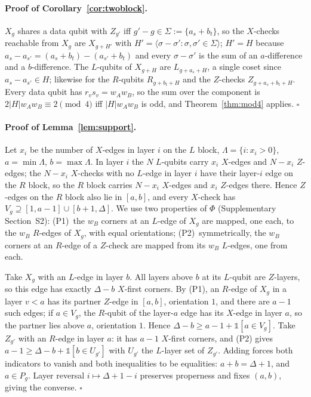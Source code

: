 \documentclass[reprint,twocolumn,superscriptaddress,nofootinbib]{revtex4-2}
\theoremstyle{plain}
\newcommand{\wA}{w_A}                  %
\newcommand{\wB}{w_B}
\begin{document}
\paragraph*{Proof of Corollary~\ref{cor:twoblock}.}
$X_g$ shares a data qubit with $Z_{g'}$ iff $g'-g\in\Sigma:=\{a_s+b_t\}$,
so the $X$-checks reachable from $X_g$ are $X_{g+H'}$ with
$H'=\langle\sigma-\sigma':\sigma,\sigma'\in\Sigma\rangle$; $H'=H$ because
$a_s-a_{s'}=(a_s+b_t)-(a_{s'}+b_t)$ and every $\sigma-\sigma'$ is the sum
of an $a$-difference and a $b$-difference. The $L$-qubits of $X_{g+H}$ are
$L_{g+a_s+H}$, a single coset since $a_s-a_{s'}\in H$; likewise for the
$R$-qubits $R_{g+b_t+H}$ and the $Z$-checks $Z_{g+a_s+b_t+H}$. Every data
qubit has $r_vs_v=\wA\wB$, so the sum over the component is
$2|H|\wA\wB\equiv2\pmod4$ iff $|H|\wA\wB$ is odd, and
Theorem~\ref{thm:mod4} applies. \hfill$\square$

\paragraph*{Proof of Lemma~\ref{lem:support}.}
Let $x_i$ be the number of $X$-edges in layer $i$ on the $L$ block,
$\Lambda=\{i:x_i>0\}$, $a=\min\Lambda$, $b=\max\Lambda$. In layer $i$ the
$N$ $L$-qubits carry $x_i$ $X$-edges and $N-x_i$ $Z$-edges; the $N-x_i$
$X$-checks with no $L$-edge in layer $i$ have their layer-$i$ edge on the
$R$ block, so the $R$ block carries $N-x_i$ $X$-edges and $x_i$ $Z$-edges
there. Hence $Z$-edges on the $R$ block also lie in $[a,b]$, and every
$X$-check has $V_g\supseteq[1,a-1]\cup[b+1,\Delta]$. We use two properties
of $\Phi$ (Supplementary Section~S2): (P1)~the $\wB$ corners at an
$L$-edge of $X_g$ are mapped, one each, to the $\wB$ $R$-edges of $X_g$,
with equal orientations; (P2)~symmetrically, the $\wB$ corners at an
$R$-edge of a $Z$-check are mapped from its $\wB$ $L$-edges, one from
each.

Take $X_g$ with an $L$-edge in layer $b$. All layers above $b$ at its
$L$-qubit are $Z$-layers, so this edge has exactly $\Delta-b$ $X$-first
corners. By (P1), an $R$-edge of $X_g$ in a layer $v<a$ has its partner
$Z$-edge in $[a,b]$, orientation $1$, and there are $a-1$ such edges; if
$a\in V_g$, the $R$-qubit of the layer-$a$ edge has its $X$-edge in layer
$a$, so the partner lies above $a$, orientation $1$. Hence
$\Delta-b\ge a-1+\mathbb{1}[a\in V_g]$. Take $Z_{g'}$ with an $R$-edge in
layer $a$: it has $a-1$ $X$-first corners, and (P2) gives
$a-1\ge\Delta-b+\mathbb{1}[b\in U_{g'}]$ with $U_{g'}$ the $L$-layer set of
$Z_{g'}$. Adding forces both indicators to vanish and both inequalities to
be equalities: $a+b=\Delta+1$, and $a\in P_g$. Layer reversal
$i\mapsto\Delta+1-i$ preserves properness and fixes $(a,b)$, giving the
converse. \hfill$\square$
\end{document}
